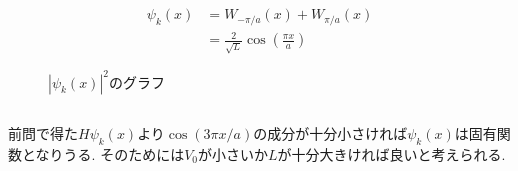 \documentclass[uplatex,a4j,11pt,dvipdfmx]{jsarticle}
\newcommand{\gnu}[2]{
\begin{figure}[hptb]
\begin{center}

\caption{#1}
\label{fig:#2}
\end{center}
\end{figure}
}
\begin{document}
\subsection{}
\begin{align*}
  \psi_k(x)&=W_{-\pi/a}(x)+W_{\pi/a}(x)\\
  &=\frac{2}{\sqrt{L}}\cos\left(\frac{\pi x}{a}\right)
\end{align*}
\gnu{$|\psi_k(x)|^2$のグラフ}{q2.tex}
\subsection{}
前問で得た$H\psi_k(x)$より$\cos(3\pi x/a)$の成分が十分小さければ$\psi_k(x)$は固有関数となりうる.
そのためには$V_0$が小さいか$L$が十分大きければ良いと考えられる.

\end{document}
